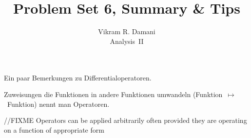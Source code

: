\documentclass[12pt]{article}
\begin{document}
\title{\vspace*{-2.5em}Problem Set 6, Summary \& Tips}
\author{Vikram R. Damani\\
    Analysis~II}

\maketitle


Ein paar Bemerkungen zu Differentialoperatoren.\vspace*{1em}

\begin{rmk}{}{} Zuweisungen die Funktionen in andere Funktionen umwandeln (Funktion~$\mapsto$~Funktion) nennt man Operatoren.
\end{rmk}\vspace*{1em}

\begin{rmk}{//FIXME}{}
    Operators can be applied arbitrarily often provided they are operating on a function of appropriate form
\end{rmk}
\end{document}
